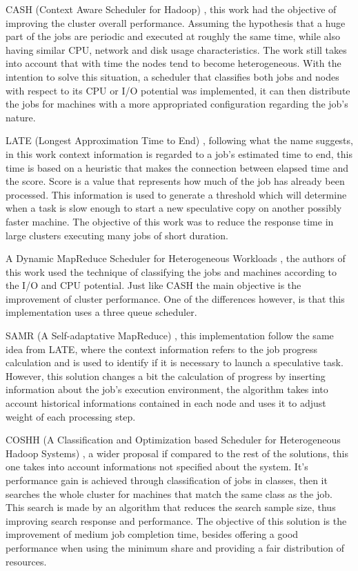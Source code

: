 CASH (Context Aware Scheduler for Hadoop) \cite{CASH}, this work had the objective of improving the cluster overall performance. Assuming the hypothesis that a huge part of the jobs are periodic and executed at roughly the same time, while also having similar CPU, network and disk usage characteristics. The work still takes into account that with time the nodes tend to become heterogeneous. With the intention to solve this situation, a scheduler that classifies both jobs and nodes with respect to its CPU or I/O potential was implemented, it can then distribute the jobs for machines with a more appropriated configuration regarding the job's nature.

LATE (Longest Approximation Time to End) \cite{LATE}, following what the name suggests, in this work context information is regarded to a job's estimated time to end, this time is based on a heuristic that makes the connection between elapsed time and the score. Score is a value that represents how much of the job has already been processed. This information is used to generate a threshold which will determine when a task is slow enough to start a new speculative copy on another possibly faster machine. The objective of this work was to reduce the response time in large clusters executing many jobs of short duration.

A Dynamic MapReduce Scheduler for Heterogeneous Workloads \cite{DMRSHW}, the authors of this work used the technique of classifying the jobs and machines according to the I/O and CPU potential. Just like CASH the main objective is the improvement of cluster performance. One of the differences however, is that this implementation uses a three queue scheduler.

SAMR (A Self-adaptative MapReduce) \cite{SAMR}, this implementation follow the same idea from LATE, where the context information refers to the job progress calculation and is used to identify if it is necessary to launch a speculative task. However, this solution changes a bit the calculation of progress by inserting information about the job's execution environment, the algorithm takes into account historical informations contained in each node and uses it to adjust weight of each processing step.

COSHH (A Classification and Optimization based Scheduler for Heterogeneous Hadoop Systems) \cite{COSHH}, a wider proposal if compared to the rest of the solutions, this one takes into account informations not specified about the system. It's performance gain is achieved through classification of jobs in classes, then it searches the whole cluster for machines that match the same class as the job. This search is made by an algorithm that reduces the search sample size, thus improving search response and performance. The objective of this solution is the improvement of medium job completion time, besides offering a good performance when using the minimum share and providing a fair distribution of resources.

